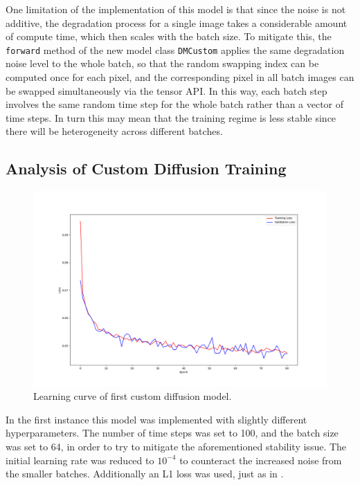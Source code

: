 \documentclass[12pt]{article}
\begin{document}
One limitation of the implementation of this model is that since the noise is not additive,
the degradation process for a single image takes a considerable amount of compute time,
which then scales with the batch size.
To mitigate this, the \texttt{forward} method of the new model class \texttt{DMCustom} applies the same degradation noise level to the whole batch,
so that the random swapping index can be computed once for each pixel,
and the corresponding pixel in all batch images can be swapped simultaneously via the tensor API.
In this way, each batch step involves the same random time step for the whole batch rather than a vector of time steps.
In turn this may mean that the training regime is less stable since there will be heterogeneity across different batches.

\subsection{Analysis of Custom Diffusion Training}

\begin{figure}[hp]
    \includegraphics[scale=0.4, center]{figures/learning_curve_9.png}
    \caption{Learning curve of first custom diffusion model.}
    \label{fig:learning_curve_9}
\end{figure}

In the first instance this model was implemented with slightly different hyperparameters.
The number of time steps was set to 100, and the batch size was set to 64, in order to try to mitigate the aforementioned stability issue.
The initial learning rate was reduced to $10^{-4}$ to counteract the increased noise from the smaller batches.
Additionally an L1 loss was used, just as in \cite{bansal2022cold}.
\end{document}

